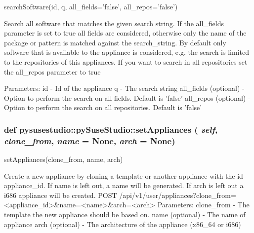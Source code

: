 \label{classpysusestudio_1_1py_suse_studio_ad74a578d8eee03662b2a157a98798dbd}
\begin{DoxyVerb}searchSoftware(id, q, all_fields='false', all_repos='false')

            Search all software that matches the given search string. If the all_fields
            parameter is set to true all fields are considered, otherwise only the name of the package 
            or pattern is matched against the search_string. 
            By default only software that is available to the appliance is considered, e.g. the search is limited to the 
            repositories of this appliances. If you want to search in all repositories set the all_repos parameter to 
            true
            
            Parameters:
id - Id of the appliance
q - The search string 
all_fields (optional) - Option to perform the search on all fields. Default is 'false'
all_repos (optional) - Option to perform the search on all repositories. Default is 'false'

        
\end{DoxyVerb}
 \hypertarget{classpysusestudio_1_1py_suse_studio_a0e4301835de3e52a600c536d5a6a22d6}{
\subsubsection[{setAppliances}]{\setlength{\rightskip}{0pt plus 5cm}def pysusestudio::pySuseStudio::setAppliances ( {\em self}, \/   {\em clone\_\-from}, \/   {\em name} = {\ttfamily None}, \/   {\em arch} = {\ttfamily None})}}
\label{classpysusestudio_1_1py_suse_studio_a0e4301835de3e52a600c536d5a6a22d6}
\begin{DoxyVerb}setAppliances(clone_from, name, arch)

        Create a new appliance by cloning a template or another appliance with the id appliance_id. 
            If name is left out, a name will be generated. If arch is left out a i686 appliance will be created.  
            POST /api/v1/user/appliances?clone_from=<appliance_id>&name=<name>&arch=<arch>
            Parameters:
clone_from - The template the new appliance should be based on. 
name (optional) - The name of appliance 
arch (optional) - The architecture of the appliance (x86_64 or i686) 

\end{DoxyVerb}
